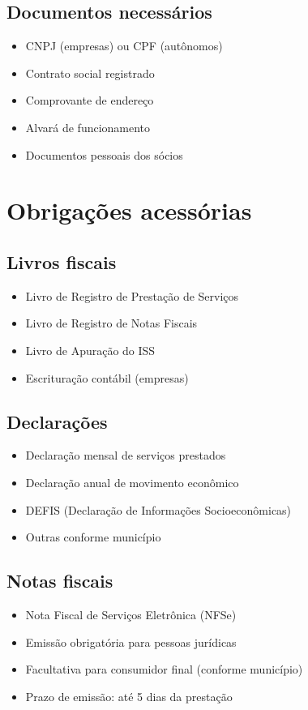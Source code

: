 \documentclass[12pt,a4paper]{article}
\begin{document}
\subsection{Documentos necessários}
\begin{itemize}
    \item CNPJ (empresas) ou CPF (autônomos)
    \item Contrato social registrado
    \item Comprovante de endereço
    \item Alvará de funcionamento
    \item Documentos pessoais dos sócios
\end{itemize}

\section{Obrigações acessórias}

\subsection{Livros fiscais}
\begin{itemize}
    \item Livro de Registro de Prestação de Serviços
    \item Livro de Registro de Notas Fiscais
    \item Livro de Apuração do ISS
    \item Escrituração contábil (empresas)
\end{itemize}

\subsection{Declarações}
\begin{itemize}
    \item Declaração mensal de serviços prestados
    \item Declaração anual de movimento econômico
    \item DEFIS (Declaração de Informações Socioeconômicas)
    \item Outras conforme município
\end{itemize}

\subsection{Notas fiscais}
\begin{itemize}
    \item Nota Fiscal de Serviços Eletrônica (NFSe)
    \item Emissão obrigatória para pessoas jurídicas
    \item Facultativa para consumidor final (conforme município)
    \item Prazo de emissão: até 5 dias da prestação
\end{itemize}
\end{document}
